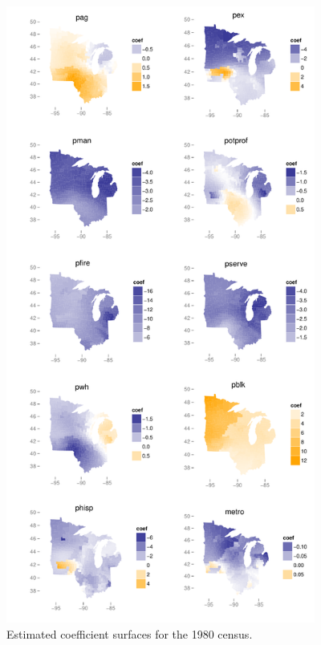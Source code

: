 \documentclass[authoryear, review, 11pt]{elsarticle}
\begin{document}
	\begin{figure}
		\begin{center}
			\includegraphics[height=8in]{../../figures/poverty/1980.linear.coefficients.pdf}
			\caption{Estimated coefficient surfaces for the 1980 census.\label{fig:census-coefs-1980}}
		\end{center}
	\end{figure}
	
\end{document}
